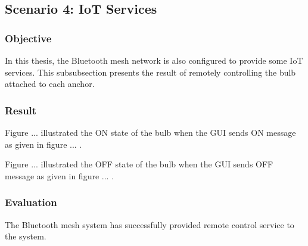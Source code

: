 \documentclass[\main/main.tex]{subfiles}
\begin{document}
\subsection{Scenario 4: IoT Services}
\subsubsection{Objective}
In this thesis, the Bluetooth mesh network is also configured to provide some IoT services. This subsubsection presents the result of remotely controlling the bulb attached to each anchor.
\subsubsection{Result}
Figure ... illustrated the ON state of the bulb when the GUI sends ON message as given in figure ... .

Figure ... illustrated the OFF state of the bulb when the GUI sends OFF message as given in figure ... .
\subsubsection{Evaluation}
The Bluetooth mesh system has successfully provided remote control service to the system.
\end{document}
